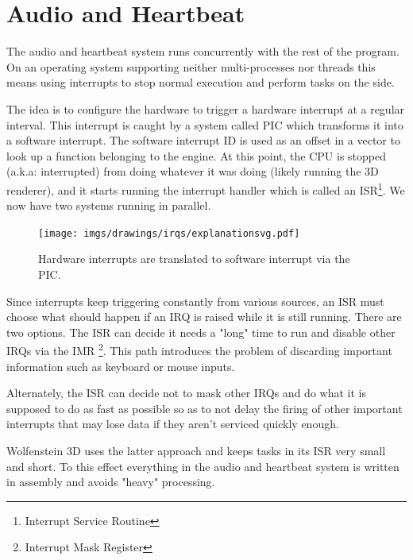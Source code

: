 \section{Audio and Heartbeat} 
\label{audio_and_heartbeat}
The audio and heartbeat system runs concurrently with the rest of the program. On an operating system supporting neither multi-processes nor threads this means using interrupts to stop normal execution and perform tasks on the side.\\
\par
The idea is to configure the hardware to trigger a hardware interrupt at a regular interval. This interrupt is caught by a system called PIC which transforms it into a software interrupt. The software interrupt ID is used as an offset in a vector to look up a function belonging to the engine. At this point, the CPU is stopped (a.k.a: interrupted) from doing whatever it was doing (likely running the 3D renderer), and it starts running the interrupt handler which is called an ISR\footnote{Interrupt Service Routine}. We now have two systems running in parallel.\\
\par
\begin{figure}[H]
  \centering
  \texttt{[image: imgs/drawings/irqs/explanationsvg.pdf]}
  \caption{Hardware interrupts are translated to software interrupt via the PIC.}
\end{figure}
\par
 Since interrupts keep triggering constantly from various sources, an ISR must choose what should happen if an IRQ is raised while it is still running. There are two options.  The ISR can decide it needs a "long" time to run and disable other IRQs via the IMR \footnote{Interrupt Mask Register}. This path introduces the problem of discarding important information such as keyboard or mouse inputs.\\
 \par
 Alternately, the ISR can decide not to mask other IRQs and do what it is supposed to do as fast as possible so as to not delay the firing of other important interrupts that may lose data if they aren't serviced quickly enough.\\
 \par
 Wolfenstein 3D uses the latter approach and keeps tasks in its ISR very small and short. To this effect everything in the audio and heartbeat system is written in assembly and avoids "heavy" processing.

